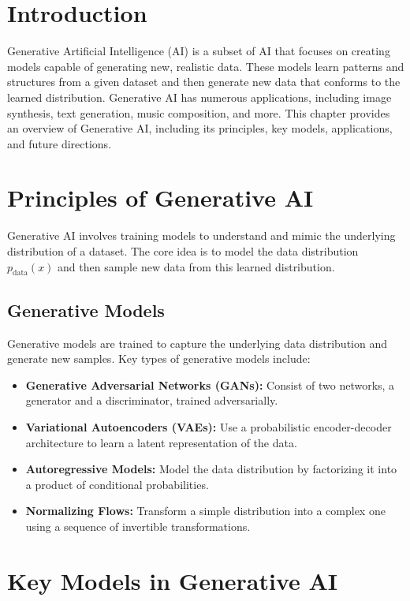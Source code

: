 \section{Introduction}
Generative Artificial Intelligence (AI) is a subset of AI that focuses on creating models capable of generating new, realistic data. These models learn patterns and structures from a given dataset and then generate new data that conforms to the learned distribution. Generative AI has numerous applications, including image synthesis, text generation, music composition, and more. This chapter provides an overview of Generative AI, including its principles, key models, applications, and future directions.

\section{Principles of Generative AI}
Generative AI involves training models to understand and mimic the underlying distribution of a dataset. The core idea is to model the data distribution \( p_{\text{data}}(x) \) and then sample new data from this learned distribution.

\subsection{Generative Models}
Generative models are trained to capture the underlying data distribution and generate new samples. Key types of generative models include:

\begin{itemize}
    \item \textbf{Generative Adversarial Networks (GANs):} Consist of two networks, a generator and a discriminator, trained adversarially.
    \item \textbf{Variational Autoencoders (VAEs):} Use a probabilistic encoder-decoder architecture to learn a latent representation of the data.
    \item \textbf{Autoregressive Models:} Model the data distribution by factorizing it into a product of conditional probabilities.
    \item \textbf{Normalizing Flows:} Transform a simple distribution into a complex one using a sequence of invertible transformations.
\end{itemize}

\section{Key Models in Generative AI}

